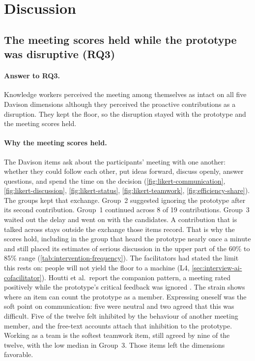 \section{Discussion}

\subsection{The meeting scores held while the prototype was disruptive (RQ3)}
\label{sec:discussion-rq3}

\paragraph{Answer to RQ3.}
Knowledge workers perceived the meeting among themselves as intact on all five
Davison dimensions although they perceived the proactive contributions as a disruption.
They kept the floor, so the disruption stayed with the prototype and the meeting
scores held.

\paragraph{Why the meeting scores held.}
The Davison items ask about the participants' meeting with one another: whether
they could follow each other, put ideas forward, discuss openly, answer
questions, and spend the time on the decision
(\autoref{fig:likert-communication}, \autoref{fig:likert-discussion},
  \autoref{fig:likert-status}, \autoref{fig:likert-teamwork},
\autoref{fig:efficiency-share}).
The groups kept that exchange.
Group~2 suggested ignoring the prototype after its second contribution.
Group~1 continued across 8 of 19 contributions.
Group~3 waited out the delay and went on with the candidates.
A contribution that is talked across stays outside the exchange those items
record.
That is why the scores hold, including in the group that heard the prototype nearly
once a minute and still placed its estimates of serious discussion in the upper
part of the 60\% to 85\% range
(\autoref{tab:intervention-frequency}).
The facilitators had stated the limit this rests on: people will not yield the
floor to a machine
(L4, \autoref{sec:interview-ai-cofacilitator}).
Houtti et al.\ report the companion pattern, a meeting rated positively while
the prototype's critical feedback was ignored
\cite{houttiObserveAskIntervene2025}.
The strain shows where an item can count the prototype as a member.
Expressing oneself was the soft point on communication: five were neutral and
two agreed that this was difficult.
Five of the twelve felt inhibited by the behaviour of another meeting member,
and the free-text accounts attach that inhibition to the prototype.
Working as a team is the softest teamwork item, still agreed by nine of the
twelve, with the low median in Group~3.
Those items left the dimensions favorable.

